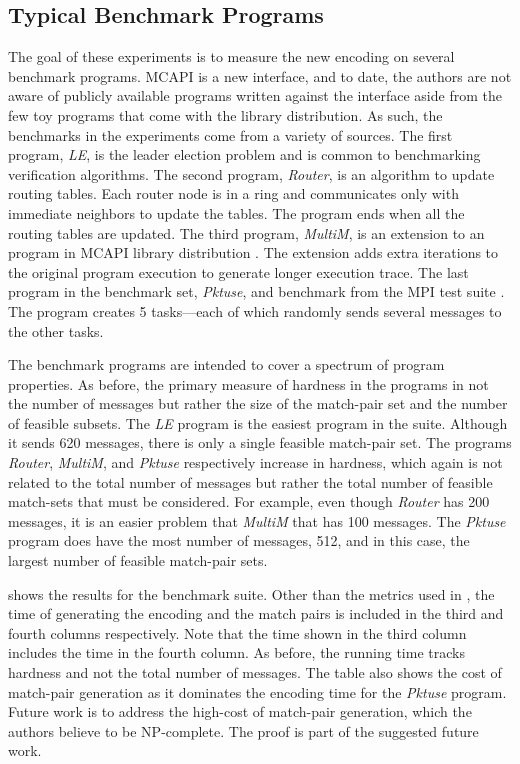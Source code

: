 \subsection{Typical Benchmark Programs}
The goal of these experiments is to measure the new encoding on several benchmark programs. MCAPI is a new interface, and to date, the authors are not aware of publicly available programs written against the interface aside from the few toy programs that come with the library distribution. As such, the benchmarks in the experiments come from a variety of sources. The first program, \textit{LE}, is the leader election problem and is common to benchmarking verification algorithms. The second program, \textit{Router}, is an algorithm to update routing tables. Each router node is in a ring and communicates only with immediate neighbors to update the tables. The program ends when all the routing tables are updated. The third program, \textit{MultiM}, is an extension to an program in MCAPI library distribution . The extension adds extra iterations to the original program execution to generate longer execution trace. The last program in the benchmark set, \textit{Pktuse}, and benchmark from the MPI test suite \cite{mpptest_benchmark}. The program creates 5 tasks---each of which randomly sends several messages to the other tasks.

The benchmark programs are intended to cover a spectrum of program properties. As before, the primary measure of hardness in the programs in not the number of messages but rather the size of the match-pair set and the number of feasible subsets.  The \textit{LE} program is the easiest program in the suite. Although it sends 620 messages, there is only a single feasible match-pair set. The programs \textit{Router}, \textit{MultiM}, and \textit{Pktuse} respectively increase in hardness, which again is not related to the total number of messages but rather the total number of feasible match-sets that must be considered. For example, even though \textit{Router} has 200 messages, it is an easier problem that \textit{MultiM} that has 100 messages. The \textit{Pktuse} program does have the most number of messages, 512, and in this case, the largest number of feasible match-pair sets.

 shows the results for the benchmark suite. Other than the metrics used in , the time of generating the encoding and the match pairs is included in the third and fourth columns respectively. Note that the time shown in the third column includes the time in the fourth column. As before, the running time tracks hardness and not the total number of messages. The table also shows the cost of match-pair generation as it dominates the encoding time for the \textit{Pktuse} program. Future work is to address the high-cost of match-pair generation, which the authors believe to be NP-complete. The proof is part of the suggested future work.

